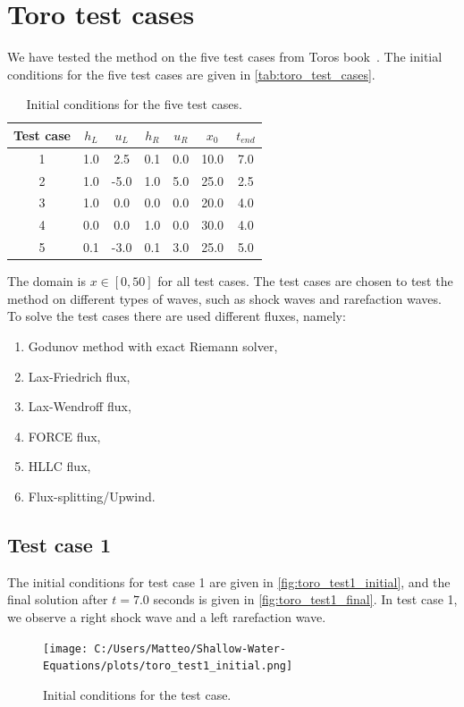 \section{Toro test cases}
We have tested the method on the five test cases from Toros book~\cite{Toro2001-Shock}.
The initial conditions for the five test cases are given in \autoref{tab:toro_test_cases}.
\begin{table}[H]
    \centering
    \begin{tabular}{c|c|c|c|c|c|c}
        \hline
        \textbf{Test case} & \textbf{$h_L$} & \textbf{$u_L$} & \textbf{$h_R$} & \textbf{$u_R$} & \textbf{$x_0$} & \textbf{$t_{end}$} \\
        \hline\hline
        1 & 1.0 & 2.5 & 0.1 & 0.0 & 10.0 & 7.0 \\
        2 & 1.0 & -5.0 & 1.0 & 5.0 & 25.0 & 2.5 \\
        3 & 1.0 & 0.0 & 0.0 & 0.0 & 20.0 & 4.0 \\
        4 & 0.0 & 0.0 & 1.0 & 0.0 & 30.0 & 4.0 \\
        5 & 0.1 & -3.0 & 0.1 & 3.0 & 25.0 & 5.0 \\
        \hline
    \end{tabular}
    \caption{Initial conditions for the five test cases.}
    \label{tab:toro_test_cases}
\end{table}
The domain is $x \in [0, 50]$ for all test cases.
The test cases are chosen to test the method on different types of waves, such as shock waves and rarefaction waves.
To solve the test cases there are used different fluxes, namely:
\begin{enumerate}
    \item Godunov method with exact Riemann solver,
    \item Lax-Friedrich flux,
    \item Lax-Wendroff flux,
    \item FORCE flux,
    \item HLLC flux,
    \item Flux-splitting/Upwind.
\end{enumerate}

\subsection*{Test case 1}
The initial conditions for test case 1 are given in \autoref{fig:toro_test1_initial}, and the final solution after $t=7.0$ seconds is given in \autoref{fig:toro_test1_final}.
In test case 1, we observe a right shock wave and a left rarefaction wave.
\begin{figure}[H]
    \centering
    \texttt{[image: C:/Users/Matteo/Shallow-Water-Equations/plots/toro\_test1\_initial.png]}
    \caption{Initial conditions for the test case.}\label{fig:toro_test1_initial}
\end{figure}

